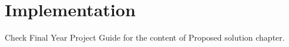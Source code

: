 
\chapter{Implementation} \label{ch:impl}
Check Final Year Project Guide for the content of Proposed solution chapter.

\clearpage %
